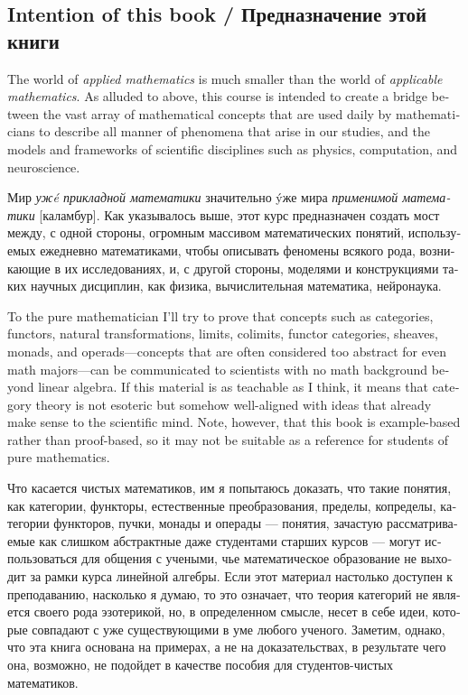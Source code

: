 \documentclass[a4paper]{book}
\theoremstyle{myth}
\begin{document}
\begin{english}

\section{Intention of this book / Предназначение этой книги}

The world of {\em applied mathematics} is much smaller than the world of {\em applicable mathematics}. As alluded to above, this course is intended to create a bridge between the vast array of mathematical concepts that are used daily by mathematicians to describe all manner of phenomena that arise in our studies, and the models and frameworks of scientific disciplines such as physics, computation, and neuroscience.

\begin{russian}Мир {\em уж\'e прикладной математики} значительно \'yже мира {\em применимой математики} [каламбур]. Как указывалось выше, этот курс предназначен создать мост между, с одной стороны, огромным массивом математических понятий, используемых ежедневно математиками, чтобы описывать феномены всякого рода, возникающие в их исследованиях, и, с другой стороны, моделями и конструкциями таких научных дисциплин, как физика, вычислительная математика, нейронаука. \end{russian}

To the pure mathematician I'll try to prove that concepts such as categories, functors, natural transformations, limits, colimits, functor categories, sheaves, monads, and operads---concepts that are often considered too abstract for even math majors---can be communicated to scientists with no math background beyond linear algebra. If this material is as teachable as I think, it means that category theory is not esoteric but somehow well-aligned with ideas that already make sense to the scientific mind. Note, however, that this book is example-based rather than proof-based, so it may not be suitable as a reference for students of pure mathematics.

\begin{russian}Что касается чистых математиков, им я попытаюсь доказать, что такие понятия, как категории, функторы, естественные преобразования, пределы, копределы, категории функторов, пучки, монады и операды — понятия, зачастую рассматриваемые как слишком абстрактные даже студентами старших курсов — могут использоваться для общения с учеными, чье математическое образование не выходит за рамки курса линейной алгебры. Если этот материал настолько доступен к преподаванию, насколько я думаю, то это означает, что теория категорий не является своего рода эзотерикой, но, в определенном смысле, несет в себе идеи, которые совпадают с уже существующими в уме любого ученого. Заметим, однако, что эта книга основана на примерах, а не на доказательствах, в результате чего она, возможно, не подойдет в качестве пособия для студентов-чистых математиков. \end{russian}


\end{english}
\end{document}
